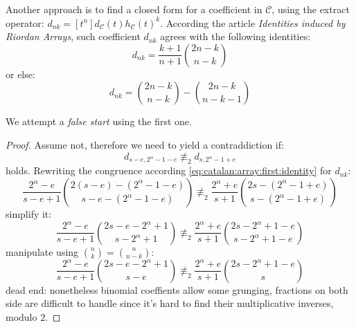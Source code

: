 Another approach is to find a closed form for a coefficient in $\mathcal{C}$,
using the extract operator: $d_{nk} = [t^{n}]d_{\mathcal{C}}(t)h_{\mathcal{C}}(t)^{k}$.
According the article \emph{Identities induced by Riordan Arrays}, such
coefficient $d_{nk}$ agrees with the following identities:
\begin{equation}
    d_{nk}=\frac{k+1}{n+1}{{2n-k}\choose{n-k}}
    \label{eq:catalan:array:first:identity}
\end{equation}
or else:
\begin{equation}
    d_{nk}={{2n-k}\choose{n-k}} - {{2n-k}\choose{n-k-1}}
    \label{eq:catalan:array:second:identity}
\end{equation}

We attempt a \emph{false start} using the first one.
\begin{proof}
Assume not, therefore we need to yield a contraddiction if:
\begin{displaymath}
    d_{s-e,2^{{\alpha}}-1-e} \not\equiv_{2} d_{s,2^{{\alpha}}-1+e}
\end{displaymath}
holds. Rewriting the congruence according \autoref{eq:catalan:array:first:identity}
 for $d_{nk}$:
\begin{displaymath}
    \frac{2^{{\alpha}}-e}{s-e+1}{{2(s-e)-(2^{{\alpha}}-1-e)}\choose{s-e-(2^{{\alpha}}-1-e)}}
    \not\equiv_{2}
    \frac{2^{{\alpha}}+e}{s+1}{{2s-(2^{{\alpha}}-1+e)}\choose{s-(2^{{\alpha}}-1+e)}}
\end{displaymath}
simplify it:
\begin{displaymath}
    \frac{2^{{\alpha}}-e}{s-e+1}{{2s-e-2^{{\alpha}}+1}\choose{s-2^{{\alpha}}+1}}
    \not\equiv_{2}
    \frac{2^{{\alpha}}+e}{s+1}{{2s-2^{{\alpha}}+1-e}\choose{s-2^{{\alpha}}+1-e}}
\end{displaymath}
manipulate using ${{n}\choose{k}}={{n}\choose{n-k}}$:
\begin{displaymath}
    \frac{2^{{\alpha}}-e}{s-e+1}{{2s-e-2^{{\alpha}}+1}\choose{s-e}}
    \not\equiv_{2}
    \frac{2^{{\alpha}}+e}{s+1}{{2s-2^{{\alpha}}+1-e}\choose{s}}
\end{displaymath}
dead end: nonetheless binomial coeffients allow some grunging,
fractions on both side are difficult to handle since it's hard
to find their multiplicative inverses, modulo $2$.
\end{proof} 

